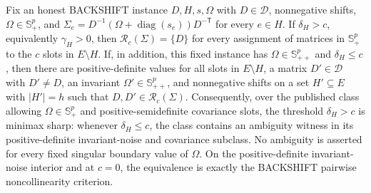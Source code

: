 Fix an honest BACKSHIFT instance \(D,H,s,\Omega\) with \(D\in\mathcal D\), nonnegative shifts, \(\Omega\in\mathbb S_{+}^{p}\), and \(\Sigma_e=D^{-1}(\Omega+\operatorname{diag}(s_e))D^{-\mathsf T}\) for every \(e\in H\). If \(\delta_H>c\), equivalently \(\gamma_H>0\), then \(\mathcal R_c(\Sigma)=\{D\}\) for every assignment of matrices in \(\mathbb S_{+}^{p}\) to the \(c\) slots in \(E\setminus H\). If, in addition, this fixed instance has \(\Omega\in\mathbb S_{++}^{p}\) and \(\delta_H\le c\), then there are positive-definite values for all slots in \(E\setminus H\), a matrix \(D'\in\mathcal D\) with \(D'\ne D\), an invariant \(\Omega'\in\mathbb S_{++}^{p}\), and nonnegative shifts on a set \(H'\subseteq E\) with \(|H'|=h\) such that \(D,D'\in\mathcal R_c(\Sigma)\). Consequently, over the published class allowing \(\Omega\in\mathbb S_{+}^{p}\) and positive-semidefinite covariance slots, the threshold \(\delta_H>c\) is minimax sharp: whenever \(\delta_H\le c\), the class contains an ambiguity witness in its positive-definite invariant-noise and covariance subclass. No ambiguity is asserted for every fixed singular boundary value of \(\Omega\). On the positive-definite invariant-noise interior and at \(c=0\), the equivalence is exactly the BACKSHIFT pairwise noncollinearity criterion.